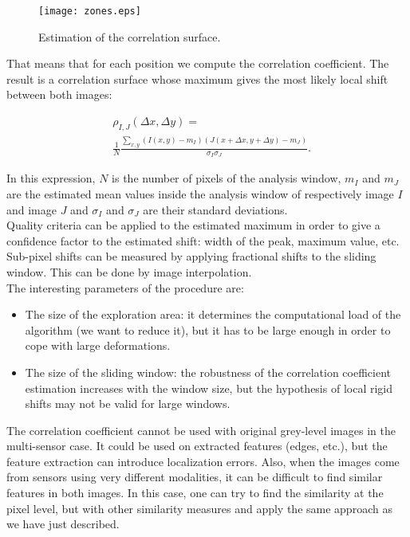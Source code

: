 \begin{figure}
\begin{center}{\texttt{[image: zones.eps]}}
\caption{Estimation of the correlation surface.}
\label{zones}
\end{center}\end{figure}


That means that for each position we compute the correlation
coefficient. The result is a correlation surface whose
maximum gives the most likely local shift between both images:

\begin{equation}
\begin{split}
&\rho_{I,J}(\Delta x, \Delta y) = \\
&\frac{1}{N}\frac{\sum_{x,y}(I(x,y)-m_I)(J(x+\Delta x,y+\Delta y)-m_J)}{\sigma_I
\sigma_J}.
\end{split}
\end{equation}

In this expression, $N$ is the number of pixels of the analysis
window, $m_I$ and $m_J$ are the estimated mean values inside the
analysis window of respectively image $I$ and image $J$ and $\sigma_I$
and $\sigma_J$ are their standard deviations.\\

Quality criteria can be applied to the estimated maximum in order to
 give a confidence factor to the estimated shift: width of the peak,
 maximum value, etc. Sub-pixel shifts can be measured by applying
 fractional shifts to the sliding window. This can be done by image interpolation.\\

The interesting parameters of the procedure are:
\begin{itemize}
\item The size of the exploration area: it determines the
computational load of the algorithm (we want to reduce it), but it has
to be large enough in order to cope with large deformations.
\item The size of the sliding window: the robustness of the correlation
coefficient estimation increases with the window size, but the
hypothesis of local rigid shifts may not be valid for large windows.
\end{itemize}

The correlation coefficient cannot be used with original grey-level
images in the multi-sensor case. It could be used on extracted
features (edges, etc.), but the feature extraction can introduce
localization errors. Also, when the images come from sensors using
very different modalities, it can be difficult to find similar
features in both images. In this case, one can try to find the
similarity at the pixel level, but with other similarity measures and
apply the same approach as we have just described.\\

